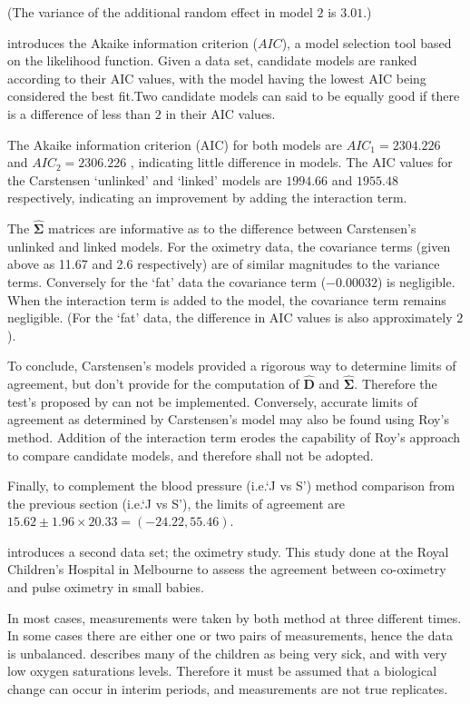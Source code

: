 \documentclass[12pt, a4paper]{report}
\theoremstyle{plain}
\theoremstyle{definition}
\theoremstyle{remark}
\begin{document}
\noindent (The variance of the additional random effect in model $2$ is $3.01$.)

\citet{akaike} introduces the Akaike information criterion ($AIC$), a model 
selection tool based on the likelihood function. Given a data set, candidate models
are ranked according to their AIC values, with the model having the lowest AIC being considered the best fit.Two candidate models can said to be equally good if there is a difference of less than $2$ in their AIC values.

The Akaike information criterion (AIC) for both models are $AIC_{1} = 2304.226$ and $AIC_{2} = 2306.226$ , indicating little difference in models. The AIC values for the Carstensen `unlinked' and `linked' models are $1994.66$ and $1955.48$ respectively, indicating an improvement by adding the interaction term.

The $\boldsymbol{\hat{\Sigma}}$ matrices are informative as to the difference between Carstensen's unlinked and linked models. For the oximetry data, the covariance terms (given above as 11.67 and 2.6 respectively) are of similar magnitudes to the variance terms. Conversely for the `fat' data the covariance term ($-0.00032$) is negligible. When the interaction term is added to the model, the covariance term remains negligible. (For the `fat' data, the difference in AIC values is also approximately $2$).

To conclude, Carstensen's models provided a rigorous way to determine limits of agreement, but don't provide for the computation of $\boldsymbol{\hat{D}}$ and $\boldsymbol{\hat{\Sigma}}$. Therefore the test's proposed by \citet{ARoy2009} can not be implemented. Conversely, accurate limits of agreement as determined by Carstensen's model may also be found using Roy's method. Addition of the interaction term erodes the capability of Roy's approach to compare candidate models, and therefore shall not be adopted.

Finally, to complement the blood pressure (i.e.`J vs S') method comparison from the previous section (i.e.`J vs S'), the limits of agreement are $15.62 \pm 1.96 \times 20.33 = (-24.22, 55.46)$.

\newpage
\citet{BXC2008} introduces a second data set; the oximetry study. This study done at the Royal Children's Hospital in Melbourne to assess the agreement between co-oximetry and pulse oximetry in small babies.


		
In most cases, measurements were taken by both method at three different times. In some cases there are either one or two pairs of measurements, hence the data is unbalanced. \citet{BXC2008} describes many of the children as being very sick, and with very low oxygen saturations levels. Therefore it must be assumed that a biological change can occur in interim periods, and measurements are not true replicates.
		
\end{document}
